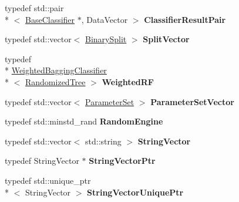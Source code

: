 \begin{DoxyCompactItemize}
\item 
\hypertarget{namespaceffactory_af415e58d4dc787d19877e4cb36da8cda}{typedef std\-::pair\\*
$<$ \hyperlink{classffactory_1_1_base_classifier}{Base\-Classifier} $\ast$, Data\-Vector $>$ {\bfseries Classifier\-Result\-Pair}}\label{namespaceffactory_af415e58d4dc787d19877e4cb36da8cda}

\item 
\hypertarget{namespaceffactory_af68fa85af8652aa3f1925299c567a557}{typedef std\-::vector$<$ \hyperlink{classffactory_1_1_binary_split}{Binary\-Split} $>$ {\bfseries Split\-Vector}}\label{namespaceffactory_af68fa85af8652aa3f1925299c567a557}

\item 
\hypertarget{namespaceffactory_ae3f22cceb64a8ef05833a5218f9eea23}{typedef \\*
\hyperlink{classffactory_1_1_weighted_bagging_classifier}{Weighted\-Bagging\-Classifier}\\*
$<$ \hyperlink{classffactory_1_1_randomized_tree}{Randomized\-Tree} $>$ {\bfseries Weighted\-R\-F}}\label{namespaceffactory_ae3f22cceb64a8ef05833a5218f9eea23}

\item 
\hypertarget{namespaceffactory_aca90fba7e4c89caf5276aa1f3512ded2}{typedef std\-::vector$<$ \hyperlink{classffactory_1_1_parameter_set}{Parameter\-Set} $>$ {\bfseries Parameter\-Set\-Vector}}\label{namespaceffactory_aca90fba7e4c89caf5276aa1f3512ded2}

\item 
\hypertarget{namespaceffactory_ab6317ea78e8ff7b0f353f2e4e172b6a9}{typedef std\-::minstd\-\_\-rand {\bfseries Random\-Engine}}\label{namespaceffactory_ab6317ea78e8ff7b0f353f2e4e172b6a9}

\item 
\hypertarget{namespaceffactory_a20e52418e69cf5b46d357b7d6ef6fd7f}{typedef std\-::vector$<$ std\-::string $>$ {\bfseries String\-Vector}}\label{namespaceffactory_a20e52418e69cf5b46d357b7d6ef6fd7f}

\item 
\hypertarget{namespaceffactory_a954b11fbd544c11720309926c901e4c1}{typedef String\-Vector $\ast$ {\bfseries String\-Vector\-Ptr}}\label{namespaceffactory_a954b11fbd544c11720309926c901e4c1}

\item 
\hypertarget{namespaceffactory_aee8470f8f183077e89ad140bc5e2fceb}{typedef std\-::unique\-\_\-ptr\\*
$<$ String\-Vector $>$ {\bfseries String\-Vector\-Unique\-Ptr}}\label{namespaceffactory_aee8470f8f183077e89ad140bc5e2fceb}

\end{DoxyCompactItemize}
